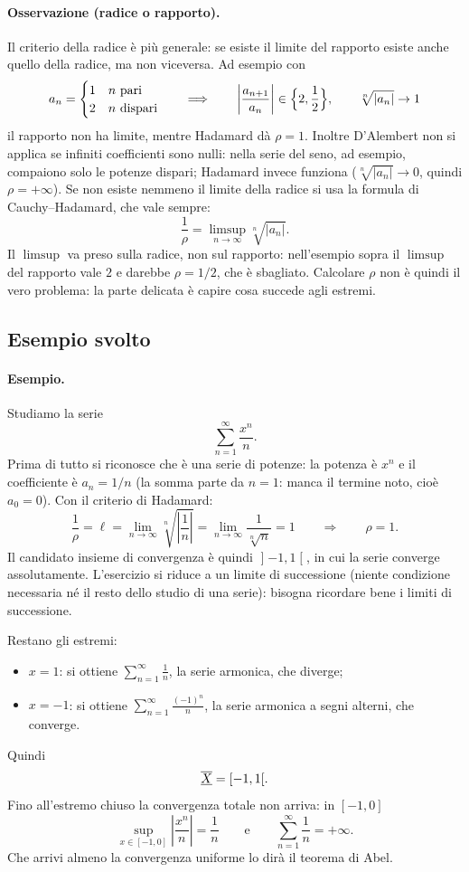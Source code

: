 \paragraph{Osservazione (radice o rapporto).} Il criterio della radice è più
generale: se esiste il limite del rapporto esiste anche quello della radice, ma
non viceversa. Ad esempio con
\[
  a_n=\begin{cases}1 & n\ \text{pari}\\ 2 & n\ \text{dispari}\end{cases}
  \qquad\Longrightarrow\qquad
  \left|\frac{a_{n+1}}{a_n}\right|\in\Bigl\{2,\frac12\Bigr\},
  \qquad \sqrt[n]{|a_n|}\to1
\]
il rapporto non ha limite, mentre Hadamard dà $\rho=1$. Inoltre D'Alembert non
si applica se infiniti coefficienti sono nulli: nella serie del seno, ad
esempio, compaiono solo le potenze dispari; Hadamard invece funziona
($\sqrt[n]{|a_n|}\to0$, quindi $\rho=+\infty$).
Se non esiste nemmeno il limite della radice si usa la formula di
Cauchy--Hadamard, che vale sempre:
\[
  \frac{1}{\rho}=\limsup_{n\to\infty}\sqrt[n]{|a_n|}.
\]
Il $\limsup$ va preso sulla radice, non sul rapporto: nell'esempio sopra il
$\limsup$ del rapporto vale $2$ e darebbe $\rho=1/2$, che è sbagliato.
Calcolare $\rho$ non è quindi il vero problema: la parte delicata è capire cosa
succede agli estremi.

\subsection{Esempio svolto}

\paragraph{Esempio.} Studiamo la serie
\[
  \sum_{n=1}^{\infty}\frac{x^n}{n}.
\]
Prima di tutto si riconosce che è una serie di potenze: la potenza è $x^n$ e il
coefficiente è $a_n=1/n$ (la somma parte da $n=1$: manca il termine noto, cioè
$a_0=0$). Con il criterio di Hadamard:
\[
  \frac{1}{\rho}=\ell=\lim_{n\to\infty}\sqrt[n]{\left|\frac{1}{n}\right|}
  =\lim_{n\to\infty}\frac{1}{\sqrt[n]{n}}=1
  \qquad\Longrightarrow\qquad \rho=1 .
\]
Il candidato insieme di convergenza è quindi $\mathopen{]}-1,1\mathclose{[}$, in
cui la serie converge assolutamente.
L'esercizio si riduce a un limite di successione (niente condizione necessaria
né il resto dello studio di una serie): bisogna ricordare bene i limiti di
successione.

Restano gli estremi:
\begin{itemize}
  \item $x=1$: si ottiene $\displaystyle\sum_{n=1}^{\infty}\frac{1}{n}$, la serie
  armonica, che diverge;
  \item $x=-1$: si ottiene $\displaystyle\sum_{n=1}^{\infty}\frac{(-1)^n}{n}$, la
  serie armonica a segni alterni, che converge.
\end{itemize}
Quindi
\[
  \overline{\underline{X}}=[-1,1\mathclose{[} .
\]
Fino all'estremo chiuso la convergenza totale non arriva: in $[-1,0]$
\[
  \sup_{x\in[-1,0]}\left|\frac{x^n}{n}\right|=\frac{1}{n}
  \qquad\text{e}\qquad \sum_{n=1}^{\infty}\frac{1}{n}=+\infty .
\]
Che arrivi almeno la convergenza uniforme lo dirà il teorema di Abel.


